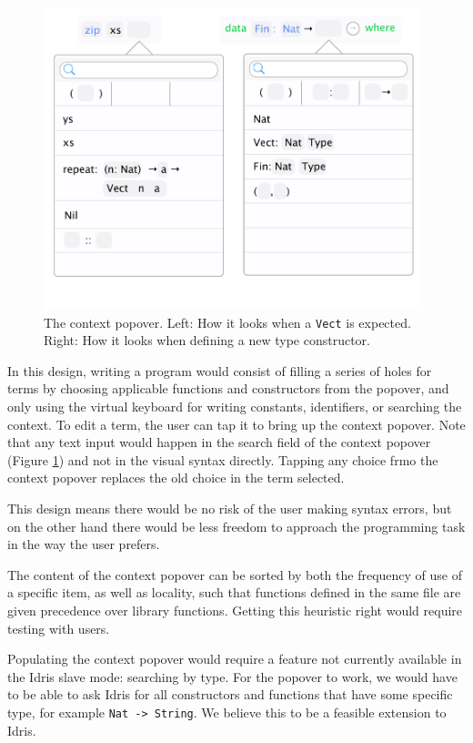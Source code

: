 \begin{figure}
	\centering
		\includegraphics[width=110mm]{diagrams/final_design_popover.pdf}
	\caption{The context popover. Left: How it looks when a \texttt{Vect} is
	expected. Right: How it looks when defining a new type constructor.}
\label{fig:new_design_popover}
\end{figure}

In this design, writing a program would consist of filling a series of holes for terms by choosing applicable functions and constructors from the popover, and only using the virtual keyboard for writing constants, identifiers, or searching
the context.
To edit a term, the user can tap it to bring up the context popover. Note that any text input would happen in the search field of the context popover (Figure \ref{fig:new_design_popover}) and
not in the visual syntax directly. Tapping any choice frmo the context popover replaces the old choice
in the term selected.

This design means there would be no risk of the user making syntax errors, but on the other hand there would be less freedom to approach the programming task in the way the user
prefers.

The content of the context popover can be sorted by both the frequency of use of a specific item, as well as locality, such that functions defined in the same file are given precedence over library functions.
Getting this heuristic right would require testing with users.

Populating the context popover would require a feature not currently available in the Idris slave mode: searching by type.
For the popover to work, we would have to be able to ask Idris for all constructors and functions that have some specific type, for example \texttt{Nat -> String}.
We believe this to be a feasible extension to Idris. 

